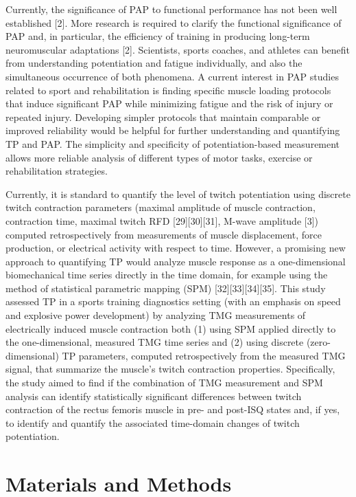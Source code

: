 \documentclass[utf8]{style/FrontiersinHarvard}
\begin{document}
Currently, the significance of PAP to functional performance has not been well established [2].
More research is required to clarify the functional significance of PAP and, in particular, the efficiency of training in producing long-term neuromuscular adaptations [2].
Scientists, sports coaches, and athletes can benefit from understanding potentiation and fatigue individually, and also the simultaneous occurrence of both phenomena. %
A current interest in PAP studies related to sport and rehabilitation is finding specific muscle loading protocols that induce significant PAP while minimizing fatigue and the risk of injury or repeated injury. %
Developing simpler protocols that maintain comparable or improved reliability would be helpful for further understanding and quantifying TP and PAP. %
The simplicity and specificity of potentiation-based measurement allows more reliable analysis of different types of motor tasks, exercise or rehabilitation strategies.

Currently, it is standard to quantify the level of twitch potentiation using discrete twitch contraction parameters (maximal amplitude of muscle contraction, contraction time, maximal twitch RFD [29][30][31], M-wave amplitude [3]) computed retrospectively from measurements of muscle displacement, force production, or electrical activity with respect to time.
However, a promising new approach to quantifying TP would analyze 
muscle response as a one-dimensional biomechanical time series directly in the time domain,
for example using the method of statistical parametric mapping (SPM) [32][33][34][35].
This study assessed TP in a sports training diagnostics setting (with an emphasis on speed and explosive power development) by analyzing TMG measurements of electrically induced muscle contraction both
(1) using SPM applied directly to the one-dimensional, measured TMG time series and 
(2) using discrete (zero-dimensional) TP parameters, computed retrospectively from the measured TMG signal, that summarize the muscle's twitch contraction properties.
Specifically, the study aimed to find if the combination of TMG measurement and SPM analysis can identify statistically significant differences between twitch contraction of the rectus femoris muscle in pre- and post-ISQ states and, if yes, to identify and quantify the associated time-domain changes of twitch potentiation.

\section{Materials and Methods}
\end{document}
